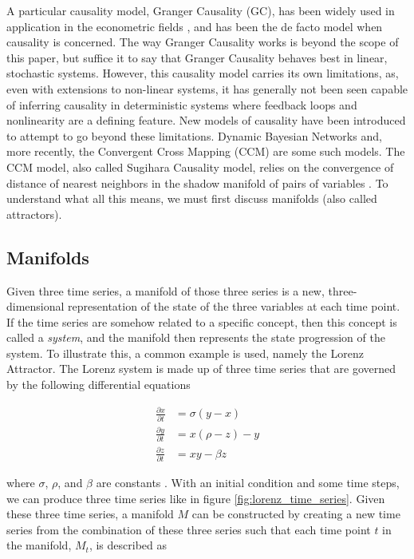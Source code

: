 A particular causality model, Granger Causality (GC), has been widely used in application in the econometric fields \cite{Granger1969}, and has been the de facto model when causality is concerned. The way Granger Causality works is beyond the scope of this paper, but suffice it to say that Granger Causality behaves best in linear, stochastic systems. However, this causality model carries its own limitations, as, even with extensions to non-linear systems, it has generally not been seen capable of inferring causality in deterministic systems where feedback loops and nonlinearity are a defining feature. New models of causality have been introduced to attempt to go beyond these limitations. Dynamic Bayesian Networks and, more recently, the Convergent Cross Mapping (CCM) are some such models. The CCM model, also called Sugihara Causality model, relies on the convergence of distance of nearest neighbors in the shadow manifold of pairs of variables \cite{Sugihara2012}. To understand what all this means, we must first discuss manifolds (also called attractors).

\subsection{Manifolds}
Given three time series, a manifold of those three series is a new, three-dimensional representation of the state of the three variables at each time point. If the time series are somehow related to a specific concept, then this concept is called a \textit{system}, and the manifold then represents the state progression of the system. To illustrate this, a common example is used, namely the Lorenz Attractor. The Lorenz system is made up of three time series that are governed by the following differential equations

\begin{align}
\frac{\partial x}{\partial t} &= \sigma(y-x) \\
\frac{\partial y}{\partial t} &= x(\rho-z) - y \\
\frac{\partial z}{\partial t} &= xy- \beta z
\end{align}

where $\sigma$, $\rho$, and $\beta$ are constants \cite{lorenz1963deterministic}. With an initial condition and some time steps, we can produce three time series like in figure \ref{fig:lorenz_time_series}. Given these three time series, a manifold $M$ can be constructed by creating a new time series from the combination of these three series such that each time point $t$ in the manifold, $M_t$, is described as 

